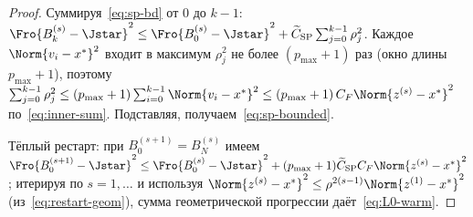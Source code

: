 \begin{proof}
Суммируя~\eqref{eq:sp-bd} от $0$ до $k-1$:
$\Fro{B_k^{(s)}-\Jstar}^{2} \le \Fro{B_0^{(s)}-\Jstar}^{2} +
\widetilde C_{\mathrm{SP}}\sum_{j=0}^{k-1}\rho_j^{2}$. Каждое
$\Norm{v_i-x^{*}}^{2}$ входит в максимум $\rho_j^{2}$ не более $(p_{\max}+1)$ раз
(окно длины $p_{\max}+1$), поэтому
$\sum_{j=0}^{k-1}\rho_j^{2} \le (p_{\max}+1)\sum_{i=0}^{k-1}\Norm{v_i-x^{*}}^{2}
\le (p_{\max}+1)\,C_F\Norm{z^{(s)}-x^{*}}^{2}$ по~\eqref{eq:inner-sum}.
Подставляя, получаем~\eqref{eq:sp-bounded}.
\par
Тёплый рестарт: при $B_0^{(s+1)} = B_N^{(s)}$ имеем
$\Fro{B_0^{(s+1)}-\Jstar}^{2} \le \Fro{B_0^{(s)}-\Jstar}^{2}
+ (p_{\max}+1)\widetilde C_{\mathrm{SP}}C_F\Norm{z^{(s)}-x^{*}}^{2}$;
итерируя по $s = 1, \ldots$ и используя
$\Norm{z^{(s)}-x^{*}}^{2} \le \rho^{2(s-1)}\Norm{z^{(1)}-x^{*}}^{2}$
(из~\eqref{eq:restart-geom}), сумма геометрической прогрессии даёт~\eqref{eq:L0-warm}.
\end{proof}

